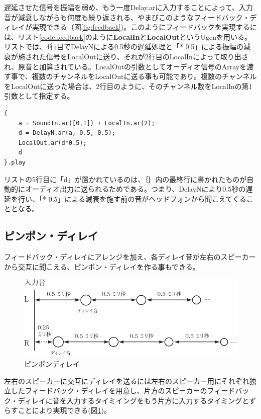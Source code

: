 \documentclass{jsarticle}
\begin{document}
遅延させた信号を振幅を弱め、もう一度Delay.arに入力することによって、入力音が減衰しながらも何度も繰り返される、やまびこのようなフィードバック・ディレイが実現できる（図\ref{fig:feedback})。このようにフィードバックを実現するには、リスト\ref{code:feedback}のように{\bf LocalIn}と{\bf LocalOut}というUgenを用いる。リストでは、4行目でDelayNによる0.5秒の遅延処理と「* 0.5」による振幅の減衰が施された信号をLocalOutに送り、それが2行目のLocalInによって取り出され、原音と加算されている。LocalOutの引数としてオーディオ信号のArrayを渡す事で、複数のチャンネルをLocalOutに送る事も可能であり。複数のチャンネルをLocalOutに送った場合は、2行目のように、そのチャンネル数をLocalInの第1引数として指定する。

\begin{lstlisting}[caption=フィードバック・ディレイ, label=code:feedback]
{
	a = SoundIn.ar([0,1]) + LocalIn.ar(2);
	d = DelayN.ar(a, 0.5, 0.5);
	LocalOut.ar(d*0.5);
	d
}.play
\end{lstlisting}

リストの5行目に「d」が置かれているのは、｛｝内の最終行に書かれたものが自動的にオーディオ出力に送られるためである。つまり、DelayNにより0.5秒の遅延を行い、「* 0.5」による減衰を施す前の音がヘッドフォンから聞こえてくることとなる。

\subsection{ピンポン・ディレイ}
フィードバック・ディレイにアレンジを加え、各ディレイ音が左右のスピーカーから交互に聞こえる、ピンポン・ディレイを作る事もできる。

\begin{figure}[htbp]
	\begin{center}
		\includegraphics[scale=0.65]{pingpong.pdf}
	\end{center}
	\label{fig:pingpong}
	\caption{ピンポンディレイ}
\end{figure}

左右のスピーカーに交互にディレイを送るには左右のスピーカー用にそれぞれ独立したフィードバック・ディレイを用意し、片方のスピーカーのフィードバック・ディレイに音を入力するタイミイングをもう片方に入力するタイミングとずらすことにより実現できる(図\ref{fig:pingpong})。
\end{document}
